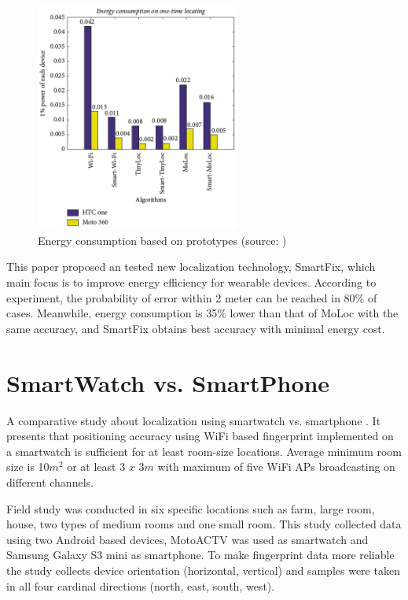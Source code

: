 \begin{figure}[H]
	\begin{centering}
		\includegraphics[width=0.6\textwidth]{img/smart_fix}
		\par\end{centering}
	\caption{Energy consumption based on prototypes (source: \cite{SmartFix})\label{fig:SmartFix}}
	\label{fig01c03}
\end{figure}

This paper proposed an tested new localization technology, SmartFix, which main focus is to improve energy efficiency for wearable devices. According to experiment, the probability of error within 2 meter can be reached in 80\% of cases. Meanwhile, energy consumption is 35\% lower than that of MoLoc with the same accuracy, and SmartFix obtains best accuracy with minimal energy cost.

\section{SmartWatch vs. SmartPhone}\label{sec:SWvsSP}
A comparative study about localization using smartwatch vs. smartphone \cite{SWvsSP}. It presents that positioning accuracy using WiFi based fingerprint implemented on a smartwatch is sufficient for at least room-size locations. Average minimum room size is 10$m^2$ or at least 3 $x$ 3$m$ with maximum of five WiFi APs broadcasting on different channels.

Field study was conducted in six specific locations such as farm, large room, house, two types of medium rooms and one small room. This study collected data using two Android based devices, MotoACTV was used as smartwatch and Samsung Galaxy S3 mini as smartphone. To make fingerprint data more reliable the study collects device orientation (horizontal, vertical) and samples were taken in all four cardinal directions (north, east, south, west).

